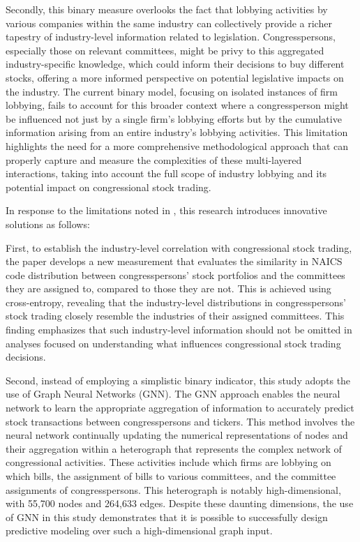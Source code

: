 \documentclass[15pt,letterpaper]{article}
\begin{document}
Secondly, this binary measure overlooks the fact that lobbying activities by various companies within the same industry can collectively provide a richer tapestry of industry-level information related to legislation. Congresspersons, especially those on relevant committees, might be privy to this aggregated industry-specific knowledge, which could inform their decisions to buy different stocks, offering a more informed perspective on potential legislative impacts on the industry. The current binary model, focusing on isolated instances of firm lobbying, fails to account for this broader context where a congressperson might be influenced not just by a single firm's lobbying efforts but by the cumulative information arising from an entire industry’s lobbying activities. This limitation highlights the need for a more comprehensive methodological approach that can properly capture and measure the complexities of these multi-layered interactions, taking into account the full scope of industry lobbying and its potential impact on congressional stock trading.

In response to the limitations noted in \cite{eg14}, this research introduces innovative solutions as follows:

First, to establish the industry-level correlation with congressional stock trading, the paper develops a new measurement that evaluates the similarity in NAICS code distribution between congresspersons' stock portfolios and the committees they are assigned to, compared to those they are not. 
This is achieved using cross-entropy, revealing that the industry-level distributions in congresspersons' stock trading closely resemble the industries of their assigned committees. 
This finding emphasizes that such industry-level information should not be omitted in analyses focused on understanding what influences congressional stock trading decisions.

Second, instead of employing a simplistic binary indicator, this study adopts the use of Graph Neural Networks (GNN). The GNN approach enables the neural network to learn the appropriate aggregation of information to accurately predict stock transactions between congresspersons and tickers. This method involves the neural network continually updating the numerical representations of nodes and their aggregation within a heterograph that represents the complex network of congressional activities. These activities include which firms are lobbying on which bills, the assignment of bills to various committees, and the committee assignments of congresspersons. 
This heterograph is notably high-dimensional, with 55,700 nodes and 264,633 edges. Despite these daunting dimensions, the use of GNN in this study demonstrates that it is possible to successfully design predictive modeling over such a high-dimensional graph input. 
\end{document}
